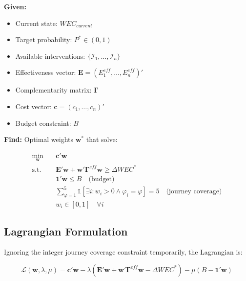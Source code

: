 \begin{tcolorbox}[colback=green!5!white, colframe=green!75!black,
    title=The Minimum Effective Portfolio Problem]

\textbf{Given:}
\begin{itemize}[nosep]
\item Current state: $WEC_{current}$
\item Target probability: $P^* \in (0, 1)$
\item Available interventions: $\{\mathcal{I}_1, \ldots, \mathcal{I}_n\}$
\item Effectiveness vector: $\mathbf{E} = (E_1^{eff}, \ldots, E_n^{eff})'$
\item Complementarity matrix: $\boldsymbol{\Gamma}$
\item Cost vector: $\mathbf{c} = (c_1, \ldots, c_n)'$
\item Budget constraint: $B$
\end{itemize}

\textbf{Find:} Optimal weights $\mathbf{w}^*$ that solve:

\begin{equation}
\boxed{
\begin{aligned}
\min_{\mathbf{w}} \quad & \mathbf{c}'\mathbf{w} \\[6pt]
\text{s.t.} \quad & \mathbf{E}'\mathbf{w} + \mathbf{w}'\boldsymbol{\Gamma}^{eff}\mathbf{w} \geq \Delta WEC^* \\[3pt]
& \mathbf{1}'\mathbf{w} \leq B \quad \text{(budget)} \\[3pt]
& \sum_{\varphi=1}^{5} \mathbb{1}[\exists i: w_i > 0 \land \varphi_i = \varphi] = 5 \quad \text{(journey coverage)} \\[3pt]
& w_i \in [0, 1] \quad \forall i
\end{aligned}
}
\label{eq:mep-full}
\end{equation}
\end{tcolorbox}

\subsection{Lagrangian Formulation}

Ignoring the integer journey coverage constraint temporarily, the Lagrangian is:

\begin{equation}
\mathcal{L}(\mathbf{w}, \lambda, \mu) = \mathbf{c}'\mathbf{w}
- \lambda \left( \mathbf{E}'\mathbf{w} + \mathbf{w}'\boldsymbol{\Gamma}^{eff}\mathbf{w} - \Delta WEC^* \right)
- \mu \left( B - \mathbf{1}'\mathbf{w} \right)
\end{equation}

